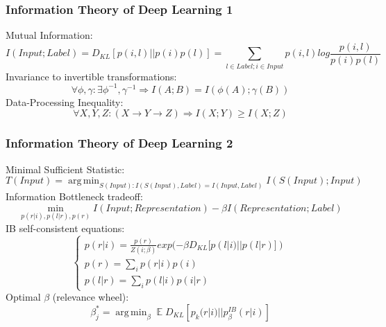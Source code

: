 \documentclass[11pt,xcolor=x11names,compress]{beamer}
\DeclareMathOperator*{\argmin}{arg\,min}
\DeclareMathOperator{\E}{\mathbb{E}}
\renewcommand{\(}{\begin{columns}}
\renewcommand{\)}{\end{columns}}
\newcommand{\<}[1]{\begin{column}{#1}}
\renewcommand{\>}{\end{column}}
\begin{document}
\begin{frame}
	\frametitle{Information Theory of Deep Learning 1}
	\footnotesize
	Mutual Information:
	\begin{equation}
		I(Input;Label) = D_{KL}[p(i,l)||p(i)p(l)] = \sum_{l \in Label; i \in Input} p(i,l) log\frac{p(i,l)}{p(i)p(l)}
	\end{equation}
	Invariance to invertible transformations: 
	\begin{equation}
		\forall \phi, \gamma: \exists \phi^{-1}, \gamma^{-1} \Rightarrow I(A;B) = I(\phi(A);\gamma(B))
	\end{equation}
	Data-Processing Inequality:
	\begin{equation}
		\forall X,Y,Z: (X \rightarrow Y \rightarrow Z) \Rightarrow I(X;Y) \geq I(X;Z)
	\end{equation}
\end{frame}

\begin{frame}
	\frametitle{Information Theory of Deep Learning 2}
	\footnotesize
	Minimal Sufficient Statistic:
	\begin{equation}
		T(Input) = \argmin_{S(Input):I(S(Input),Label)=I(Input, Label)} I(S(Input); Input)
	\end{equation}
	Information Bottleneck tradeoff:
	\begin{equation}
		\min_{p(r|i),p(l|r),p(r)} I(Input;Representation) - \beta I(Representation;Label)
	\end{equation}
	IB self-consistent equations:
	\begin{equation}
		\begin{cases}
			p(r|i) = \frac{p(r)}{Z(i;\beta)} exp(-\beta D_{KL}[p(l|i)||p(l|r)]) \\
			p(r) = \sum_{i}p(r|i)p(i) \\
			p(l|r) = \sum_{i}p(l|i)p(i|r)
		\end{cases}
	\end{equation}
	Optimal $\beta$ (relevance wheel):
	\begin{equation}
		\beta^{*}_j = \argmin_{\beta} \E D_{KL} [p_k(r|i) || p_{\beta}^{IB}(r|i)]
	\end{equation}
\end{frame}
\end{document}
